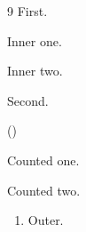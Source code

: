 \documentclass{memoir}
\newcounter{foo}
\begin{document}
\begin{thebibliography}{9}
 First.
 \begin{list}{}{}\item Inner one.\item Inner two.\end{list}
 Second.
 \begin{list}{()}{}\item Counted one.\item Counted two.\end{list}
\end{thebibliography}
\begin{enumerate}\item Outer.
\end{enumerate}
\end{document}
